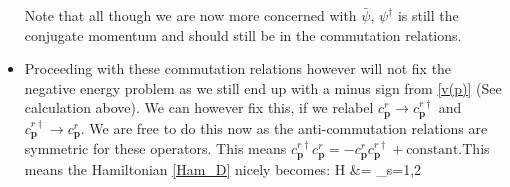 \documentclass[11pt]{article}
\renewenvironment{flalign}{\vspace{-2mm}\empheq[box=\tcbhighmath]{align}}{\endempheq}
\numberwithin{equation}{section}
\begin{document}
\begin{itemize}
  Note that all though we are now more concerned with $\bar{\psi}$, $\psi^{\dagger}$ is still the conjugate momentum and should still be in the commutation relations.

\item Proceeding with these commutation relations however will not fix the negative energy problem as we still end up with a minus sign from \ref{v(p)} (See calculation above). We can however fix this, if we relabel $c^{r}_{\textbf{p}} \rightarrow c^{r\dagger}_{\textbf{p}}$ and $c^{r\dagger}_{\textbf{p}} \rightarrow c^{r}_{\textbf{p}}$. We are free to do this now as the anti-commutation relations are symmetric for these operators.  This means $c^{r\dagger}_{\textbf{p}}c^{r}_{\textbf{p}} = - c^{r}_{\textbf{p}}c^{r\dagger}_{\textbf{p}}  +\text{constant}$.This means the Hamiltonian \ref{Ham_D} nicely becomes: 
 \begin{flalign}
           H  &= \sum_{s=1,2}\int {}
  \end{flalign}  
\end{itemize}
\end{document}

